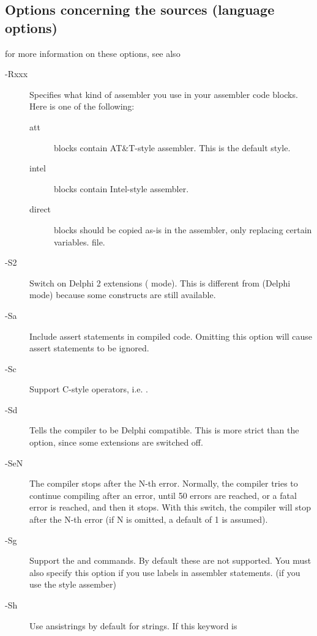 
\subsection{Options concerning the sources (language options)}
\label{se:sourceoptions}
for more information on these options, see also \progref
\begin{description}
\item [-Rxxx]  Specifies what kind of assembler you use in
your  assembler code blocks. Here  is one of the following:
\begin{description}
\item [att\ ]  blocks contain AT\&T-style  assembler.
This is the default style.
\item [intel]  blocks contain Intel-style assembler.
\item [direct]  blocks should be copied as-is in the assembler,
only replacing certain variables.
file.
\end{description}
\item [-S2]  Switch on Delphi 2 extensions ( mode). 
This is different from  (Delphi mode) because some \fpc constructs 
are still available.
\item [-Sa]  Include assert statements in compiled code. Omitting 
this option will cause assert statements to be ignored.
\item [-Sc]  Support C-style operators, i.e. .
\item [-Sd] Tells the compiler to be Delphi compatible. This is more strict
than the  option, since some  extensions are switched off.
\item [-SeN]  The compiler stops after the N-th error. Normally,
the compiler tries to continue compiling after an error, until 50 errors are
reached, or a fatal error is reached, and then it stops. With this switch,
the compiler will stop after the N-th error (if N is omitted, a default of 1
is assumed).
\item [-Sg]  Support the  and  commands. By
default these are not supported. You must also specify this option if you
use labels in assembler statements. (if you use the  style
assember)
\item [-Sh] Use ansistrings by default for strings. If this keyword is

\end{description}
